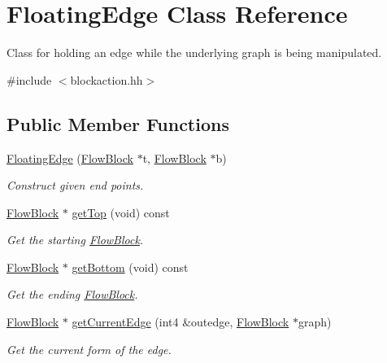 \hypertarget{class_floating_edge}{}\section{Floating\+Edge Class Reference}
\label{class_floating_edge}


Class for holding an edge while the underlying graph is being manipulated.  




{\ttfamily \#include $<$blockaction.\+hh$>$}

\subsection*{Public Member Functions}
\begin{DoxyCompactItemize}
\item 
\mbox{\hyperlink{class_floating_edge_a72ad665c68c1308a110a1a84903b760e}{Floating\+Edge}} (\mbox{\hyperlink{class_flow_block}{Flow\+Block}} $\ast$t, \mbox{\hyperlink{class_flow_block}{Flow\+Block}} $\ast$b)
\begin{DoxyCompactList}\small\item\em Construct given end points. \end{DoxyCompactList}\item 
\mbox{\hyperlink{class_flow_block}{Flow\+Block}} $\ast$ \mbox{\hyperlink{class_floating_edge_aca226310bf8b5e65a4a34434814412d0}{get\+Top}} (void) const
\begin{DoxyCompactList}\small\item\em Get the starting \mbox{\hyperlink{class_flow_block}{Flow\+Block}}. \end{DoxyCompactList}\item 
\mbox{\hyperlink{class_flow_block}{Flow\+Block}} $\ast$ \mbox{\hyperlink{class_floating_edge_ad9c70dbd864a8391b1ceb01d2d60ca68}{get\+Bottom}} (void) const
\begin{DoxyCompactList}\small\item\em Get the ending \mbox{\hyperlink{class_flow_block}{Flow\+Block}}. \end{DoxyCompactList}\item 
\mbox{\hyperlink{class_flow_block}{Flow\+Block}} $\ast$ \mbox{\hyperlink{class_floating_edge_afe06b54ef60e438326f48f0d466df0ff}{get\+Current\+Edge}} (int4 \&outedge, \mbox{\hyperlink{class_flow_block}{Flow\+Block}} $\ast$graph)
\begin{DoxyCompactList}\small\item\em Get the current form of the edge. \end{DoxyCompactList}\end{DoxyCompactItemize}



